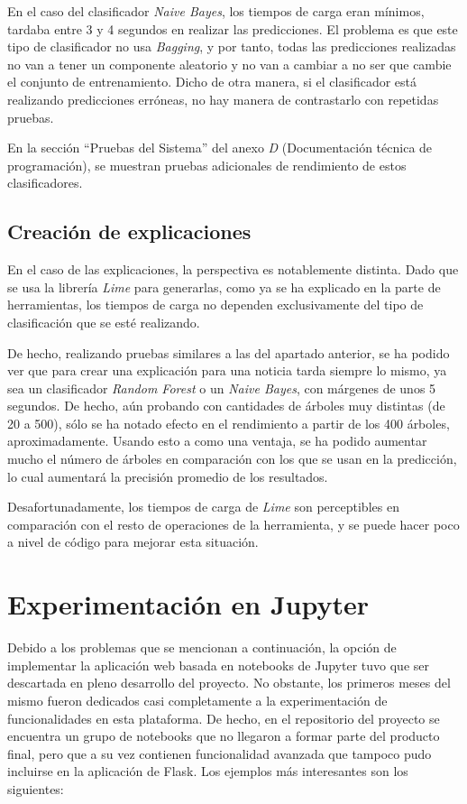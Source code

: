 En el caso del clasificador \emph{Naive Bayes}, los tiempos de carga eran mínimos, tardaba entre 3 y 4 segundos en realizar las predicciones. El problema es que este tipo de clasificador no usa \emph{Bagging}, y por tanto, todas las predicciones realizadas no van a tener un componente aleatorio y no van a cambiar a no ser que cambie el conjunto de entrenamiento. Dicho de otra manera, si el clasificador está realizando predicciones erróneas, no hay manera de contrastarlo con repetidas pruebas.

En la sección ``Pruebas del Sistema'' del anexo \emph{D} (Documentación técnica de programación), se muestran pruebas adicionales de rendimiento de estos clasificadores.

\subsection{Creación de explicaciones}

En el caso de las explicaciones, la perspectiva es notablemente distinta. Dado que se usa la librería \emph{Lime} para generarlas, como ya se ha explicado en la parte de herramientas, los tiempos de carga no dependen exclusivamente del tipo de clasificación que se esté realizando. 

De hecho, realizando pruebas similares a las del apartado anterior, se ha podido ver que para crear una explicación para una noticia tarda siempre lo mismo, ya sea un clasificador \emph{Random Forest} o un \emph{Naive Bayes}, con márgenes de unos 5 segundos. De hecho, aún probando con cantidades de árboles muy distintas (de 20 a 500), sólo se ha notado efecto en el rendimiento a partir de los 400 árboles, aproximadamente. Usando esto a como una ventaja, se ha podido aumentar mucho el número de árboles en comparación con los que se usan en la predicción, lo cual aumentará la precisión promedio de los resultados.

Desafortunadamente, los tiempos de carga de \emph{Lime} son perceptibles en comparación con el resto de operaciones de la herramienta, y se puede hacer poco a nivel de código para mejorar esta situación.

\section{Experimentación en Jupyter}

Debido a los problemas que se mencionan a continuación, la opción de implementar la aplicación web basada en notebooks de Jupyter tuvo que ser descartada en pleno desarrollo del proyecto.
No obstante, los primeros meses del mismo fueron dedicados casi completamente a la experimentación de funcionalidades en esta plataforma. De hecho, en el repositorio del proyecto se encuentra un grupo de notebooks que no llegaron a formar parte del producto final, pero que a su vez contienen funcionalidad avanzada que tampoco pudo incluirse en la aplicación de Flask. Los ejemplos más interesantes son los siguientes:

